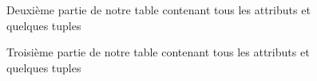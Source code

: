 \documentclass[a4paper,sffamily,12pt]{article}
\begin{document}
		\begin{figure}[!h]
			\centering						
			\caption{Deuxième partie de notre table contenant tous les attributs et quelques tuples}
			\label{table_p2}	
		\end{figure}			

		\begin{figure}[!h]
			\centering						
			\caption{Troisième partie de notre table contenant tous les attributs et quelques tuples}
			\label{table_p3}	
		\end{figure}	
\end{document}

